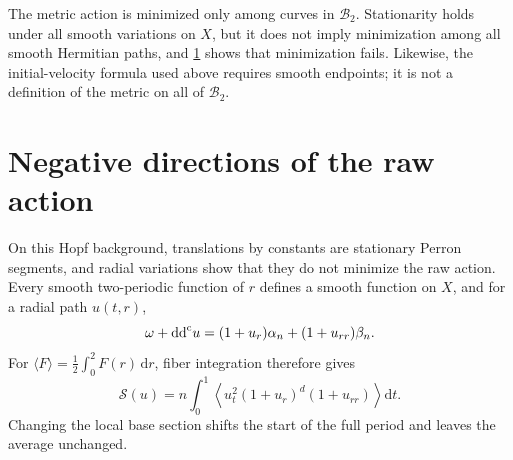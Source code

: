 The metric action is minimized only among curves in $\mathcal B_2$. Stationarity holds under all smooth variations on $X$, but it does not imply minimization among all smooth Hermitian paths, and \cref{sec:hopf-action-saddles} shows that minimization fails. Likewise, the initial-velocity formula used above requires smooth endpoints; it is not a definition of the metric on all of $\mathcal B_2$.

\section{Negative directions of the raw action}
\label{sec:hopf-action-saddles}

On this Hopf background, translations by constants are stationary Perron segments, and radial variations show that they do not minimize the raw action. Every smooth two-periodic function of $r$ defines a smooth function on $X$, and for a radial path $u(t,r)$,
\[
 \omega+\mathrm{dd}^{\mathrm{c}} u=(1+u_r)\alpha_n+(1+u_{rr})\beta_n.
\]
For $\langle F\rangle=\frac12\int_0^2F(r)\,\mathrm dr$, fiber integration therefore gives
\begin{equation}\label{eq:hopf-radial-action}
 \mathscr S(u)=n\int_0^1
 \left\langle u_t^2(1+u_r)^d(1+u_{rr})\right\rangle\mathrm dt.
\end{equation}
Changing the local base section shifts the start of the full period and leaves the average unchanged.

